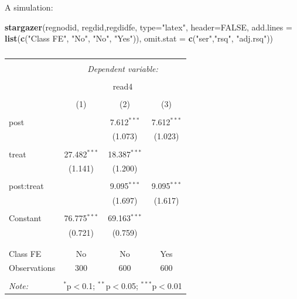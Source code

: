 \documentclass[
  ignorenonframetext,
]{beamer}
\newenvironment{Shaded}{\begin{snugshade}}{\end{snugshade}}
\newcommand{\DataTypeTok}[1]{\textcolor[rgb]{0.13,0.29,0.53}{#1}}
\newcommand{\KeywordTok}[1]{\textcolor[rgb]{0.13,0.29,0.53}{\textbf{#1}}}
\newcommand{\NormalTok}[1]{#1}
\newcommand{\OtherTok}[1]{\textcolor[rgb]{0.56,0.35,0.01}{#1}}
\newcommand{\StringTok}[1]{\textcolor[rgb]{0.31,0.60,0.02}{#1}}
\begin{document}
\begin{frame}[fragile]{A simulation:}
\protect\hypertarget{a-simulation-4}{}
\tiny

\begin{Shaded}
\begin{Highlighting}[]
\KeywordTok{stargazer}\NormalTok{(regnodid, regdid,regdidfe, }\DataTypeTok{type=}\StringTok{"latex"}\NormalTok{, }\DataTypeTok{header=}\OtherTok{FALSE}\NormalTok{, }
          \DataTypeTok{add.lines =} \KeywordTok{list}\NormalTok{(}\KeywordTok{c}\NormalTok{(}\StringTok{"Class FE"}\NormalTok{, }\StringTok{"No"}\NormalTok{, }\StringTok{"No"}\NormalTok{, }\StringTok{"Yes"}\NormalTok{)), }\DataTypeTok{omit.stat =} \KeywordTok{c}\NormalTok{(}\StringTok{"ser"}\NormalTok{,}\StringTok{"rsq"}\NormalTok{, }\StringTok{"adj.rsq"}\NormalTok{))}
\end{Highlighting}
\end{Shaded}

\begin{table}[!htbp] \centering 
  \caption{} 
  \label{} 
\begin{tabular}{@{\extracolsep{5pt}}lccc} 
\\[-1.8ex]\hline 
\hline \\[-1.8ex] 
 & \multicolumn{3}{c}{\textit{Dependent variable:}} \\ 
\cline{2-4} 
\\[-1.8ex] & \multicolumn{3}{c}{read4} \\ 
\\[-1.8ex] & (1) & (2) & (3)\\ 
\hline \\[-1.8ex] 
 post &  & 7.612$^{***}$ & 7.612$^{***}$ \\ 
  &  & (1.073) & (1.023) \\ 
  & & & \\ 
 treat & 27.482$^{***}$ & 18.387$^{***}$ &  \\ 
  & (1.141) & (1.200) &  \\ 
  & & & \\ 
 post:treat &  & 9.095$^{***}$ & 9.095$^{***}$ \\ 
  &  & (1.697) & (1.617) \\ 
  & & & \\ 
 Constant & 76.775$^{***}$ & 69.163$^{***}$ &  \\ 
  & (0.721) & (0.759) &  \\ 
  & & & \\ 
\hline \\[-1.8ex] 
Class FE & No & No & Yes \\ 
Observations & 300 & 600 & 600 \\ 
\hline 
\hline \\[-1.8ex] 
\textit{Note:}  & \multicolumn{3}{r}{$^{*}$p$<$0.1; $^{**}$p$<$0.05; $^{***}$p$<$0.01} \\ 
\end{tabular} 
\end{table}
\end{frame}
\end{document}
